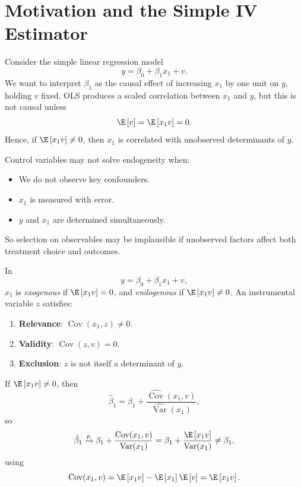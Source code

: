 
\section{Motivation and the Simple IV Estimator}

\begin{remark}[Motivation]
	Consider the simple linear regression model \[
		y = \beta_0 + \beta_1 x_1 + v
	.\]
	We want to interpret $\beta_1$ as the causal effect of increasing $x_1$ by one unit on $y$, holding $v$ fixed. OLS produces a scaled correlation between $x_1$ and $y$, but this is not causal unless \[
		\E\left[v\right] = \E\left[x_1 v\right] = 0
	.\]
	Hence, if $\E\left[x_1 v\right] \ne 0$, then $x_1$ is correlated with unobserved determinants of $y$.
\end{remark}

\begin{remark}
	Control variables may not solve endogeneity when:
	\begin{itemize}
		\item We do not observe key confounders.
		\item $x_1$ is measured with error.
		\item $y$ and $x_1$ are determined simultaneously.
	\end{itemize}
	So selection on observables may be implausible if unobserved factors affect both treatment choice and outcomes.
\end{remark}

\begin{definition}
	In \[
		y = \beta_0 + \beta_1 x_1 + v
	,\]
	$x_1$ is \emph{exogenous} if $\E\left[x_1 v\right] = 0$, and \emph{endogenous} if $\E\left[x_1 v\right] \ne 0$. An instrumental variable $z$ satisfies:
	\begin{enumerate}[label=(\roman*)]
		\item \textbf{Relevance}: $\operatorname{Cov}(x_1, z) \ne 0$.
		\item \textbf{Validity}: $\operatorname{Cov}(z, v) = 0$.
		\item \textbf{Exclusion}: $z$ is not itself a determinant of $y$.
	\end{enumerate}
\end{definition}

\begin{proposition}
	If $\E\left[x_1 v\right] \ne 0$, then \[
		\hat{\beta}_1 = \beta_1 + \frac{\widehat{\operatorname{Cov}}(x_1, v)}{\widehat{\operatorname{Var}}(x_1)}
	,\]
	so \[
		\hat{\beta}_1 \xrightarrow{p} \beta_1 + \frac{\operatorname{Cov}(x_1, v)}{\operatorname{Var}(x_1)} = \beta_1 + \frac{\E\left[x_1 v\right]}{\operatorname{Var}(x_1)} \ne \beta_1
	,\]
	using \[
		\operatorname{Cov}(x_1, v) = \E\left[x_1 v\right] - \E\left[x_1\right]\E\left[v\right] = \E\left[x_1 v\right]
	.\]
\end{proposition}

